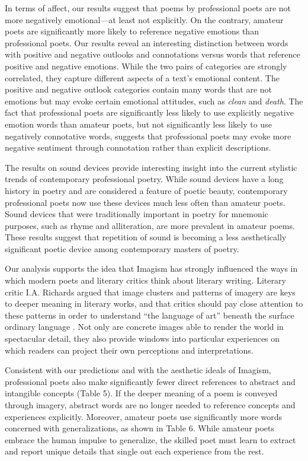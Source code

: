 \documentclass{book}
\begin{document}
In terms of affect, our results suggest that poems by professional poets are not more negatively emotional---at least not explicitly. On the contrary, amateur poets are significantly more likely to reference negative emotions than professional poets. Our results reveal an interesting distinction between words with positive and negative outlooks and connotations versus words that reference positive and negative emotions. While the two pairs of categories are strongly correlated, they capture different aspects of a text's emotional content. The positive and negative outlook categories contain many words that are not emotions but may evoke certain emotional attitudes, such as \emph{clean} and \emph{death}. The fact that professional poets are significantly less likely to use explicitly negative emotion words than amateur poets, but not significantly less likely to use negatively connotative words, suggests that professional poets may evoke more negative sentiment through connotation rather than explicit descriptions.

The results on sound devices provide interesting insight into the current stylistic trends of contemporary professional poetry. While sound devices have a long history in poetry and are considered a feature of poetic beauty, contemporary professional poets now use these devices much less often than amateur poets. Sound devices that were traditionally important in poetry for mnemonic purposes, such as rhyme and alliteration, are more prevalent in amateur poems. These results suggest that repetition of sound is becoming a less aesthetically significant poetic device among contemporary masters of poetry.

Our analysis supports the idea that Imagism has strongly influenced the ways in which modern poets and literary critics think about literary writing. Literary critic I.A. Richards argued that image clusters and patterns of imagery are keys to deeper meaning in literary works, and that critics should pay close attention to these patterns in order to understand ``the language of art'' beneath the surface ordinary language \citep{critic}. Not only are concrete images able to render the world in spectacular detail, they also provide windows into particular experiences on which readers can project their own perceptions and interpretations.

Consistent with our predictions and with the aesthetic ideals of Imagism, professional poets also make significantly fewer direct references to abstract and intangible concepts (Table 5). If the deeper meaning of a poem is conveyed through imagery, abstract words are no longer needed to reference concepts and experiences explicitly. Moreover, amateur poets use significantly more words concerned with generalizations, as shown in Table 6. While amateur poets embrace the human impulse to generalize, the skilled poet must learn to extract and report unique details that single out each experience from the rest. 
\end{document}

